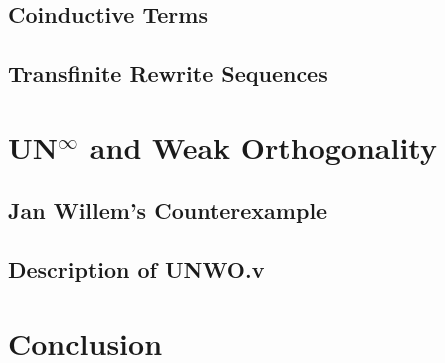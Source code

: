 \documentclass[11pt,oneside,a4paper,final]{report}
\theoremstyle{definition}
\begin{document}
\section{Coinductive Terms}


\section{Transfinite Rewrite Sequences}


\chapter{UN\texorpdfstring{$^\infty$}{} and Weak Orthogonality}\label{chap:unwo}


\section{Jan Willem's Counterexample}


\section{Description of UNWO.v}


\chapter{Conclusion}\label{chap:conclusion}


\pagebreak


\nocite{*}


\end{document}
